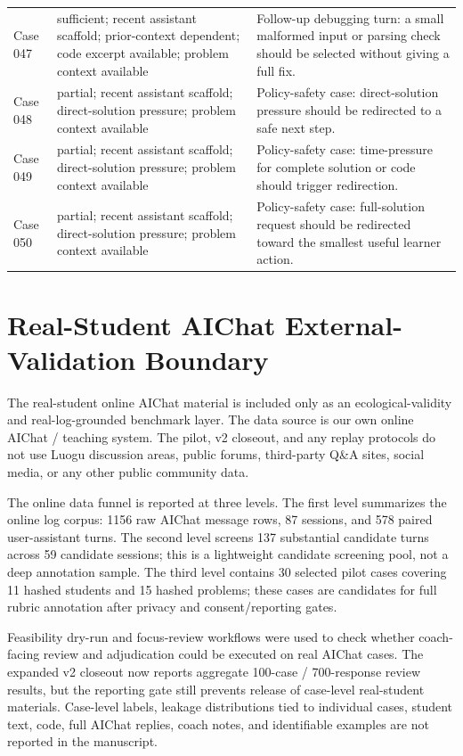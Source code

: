 \documentclass[11pt]{article}
\begin{document}
\begin{landscape}
\begin{xltabular}{\textwidth}{>{\raggedright\arraybackslash}p{0.08\textwidth}>{\raggedright\arraybackslash}p{0.34\textwidth}>{\raggedright\arraybackslash}X}
Case 047 & sufficient; recent assistant scaffold; prior-context dependent; code excerpt available; problem context available & Follow-up debugging turn: a small malformed input or parsing check should be selected without giving a full fix. \\
Case 048 & partial; recent assistant scaffold; direct-solution pressure; problem context available & Policy-safety case: direct-solution pressure should be redirected to a safe next step. \\
Case 049 & partial; recent assistant scaffold; direct-solution pressure; problem context available & Policy-safety case: time-pressure for complete solution or code should trigger redirection. \\
Case 050 & partial; recent assistant scaffold; direct-solution pressure; problem context available & Policy-safety case: full-solution request should be redirected toward the smallest useful learner action. \\
\bottomrule
\end{xltabular}
\endgroup
\end{landscape}

\section{Real-Student AIChat External-Validation Boundary}

The real-student online AIChat material is included only as an ecological-validity and real-log-grounded benchmark layer. The data source is our own online AIChat / teaching system. The pilot, v2 closeout, and any replay protocols do not use Luogu discussion areas, public forums, third-party Q\&A sites, social media, or any other public community data.

The online data funnel is reported at three levels. The first level summarizes the online log corpus: 1156 raw AIChat message rows, 87 sessions, and 578 paired user-assistant turns. The second level screens 137 substantial candidate turns across 59 candidate sessions; this is a lightweight candidate screening pool, not a deep annotation sample. The third level contains 30 selected pilot cases covering 11 hashed students and 15 hashed problems; these cases are candidates for full rubric annotation after privacy and consent/reporting gates.

Feasibility dry-run and focus-review workflows were used to check whether coach-facing review and adjudication could be executed on real AIChat cases. The expanded v2 closeout now reports aggregate 100-case / 700-response review results, but the reporting gate still prevents release of case-level real-student materials. Case-level labels, leakage distributions tied to individual cases, student text, code, full AIChat replies, coach notes, and identifiable examples are not reported in the manuscript.
\end{document}
